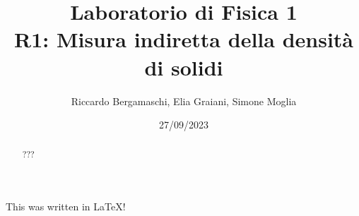 \documentclass{article}
\title{
    Laboratorio di Fisica 1\\
    R1: Misura indiretta della densità di solidi
}
\author{Riccardo Bergamaschi, Elia Graiani, Simone Moglia}
\date{27/09/2023}
\begin{document}
\maketitle
\begin{abstract}
    ???
\end{abstract}
This was written in \left\lfloor \LaTeX\right\rfloor !
\end{document}
